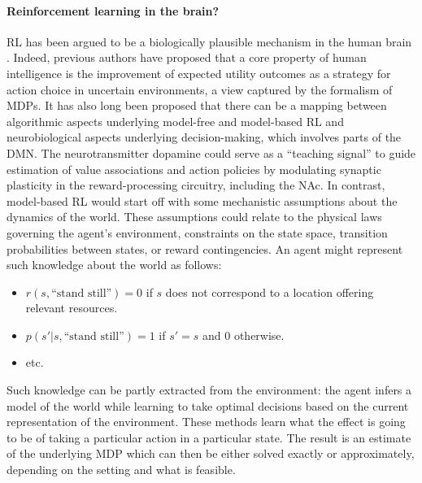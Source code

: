 \documentclass[10pt,letterpaper]{article}
\begin{document}


\paragraph*{Reinforcement learning in the brain?}
RL has been argued to be a biologically plausible mechanism in the human brain
\citep{doherty2015structure, daw2014algorithmic}.
Indeed,
previous authors have proposed
\citep{gershman2015computational} that a core property of human intelligence is the improvement
of expected utility outcomes as a strategy for action choice in uncertain
environments, a view captured by the formalism of MDPs.
It has also long been proposed \citep{dayan2008decision} that there
can be a mapping between algorithmic aspects
underlying model-free and model-based RL
and neurobiological aspects underlying decision-making, which involves parts of the DMN.
The neurotransmitter dopamine could serve
as a ``teaching signal'' to guide estimation of value associations
and action policies by modulating
synaptic plasticity in the reward-processing circuitry, including the NAc.
In contrast, model-based RL would start off with some mechanistic assumptions about the dynamics of the world.
These assumptions could relate to the
physical laws governing the agent's environment, constraints on the state space, transition probabilities between states, or reward contingencies.
An agent might represent such knowledge about the world as follows:
\begin{itemize}
\item $r(s, \text{``stand still''}) = 0$ if $s$ does not correspond to a location
offering relevant resources.
\item $p(s'|s,\text{``stand still''}) = 1$ if $s'=s$ and $0$ otherwise.
\item etc.
\end{itemize}
Such knowledge can be partly extracted from the environment: the agent infers a model of the world while learning to take optimal decisions based on the current representation of the environment. These methods learn what the effect is going to be of taking a particular action in a particular state. The result is an estimate of the underlying MDP which can then be either solved exactly or approximately, depending on the setting and what is feasible.
\end{document}
